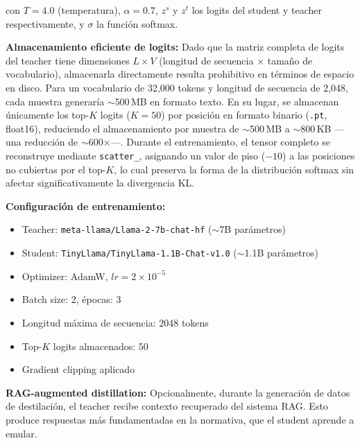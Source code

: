 \documentclass[conference]{IEEEtran}
\begin{document}
con $T=4.0$ (temperatura), $\alpha=0.7$, $z^s$ y $z^t$ los logits del student y teacher respectivamente, y $\sigma$ la funci\'on softmax.

\textbf{Almacenamiento eficiente de logits:} Dado que la matriz completa de logits del teacher tiene dimensiones $L \times V$ (longitud de secuencia $\times$ tama\~no de vocabulario), almacenarla directamente resulta prohibitivo en t\'erminos de espacio en disco. Para un vocabulario de 32,000 tokens y longitud de secuencia de 2,048, cada muestra generar\'ia $\sim$500\,MB en formato texto. En su lugar, se almacenan \'unicamente los top-$K$ logits ($K=50$) por posici\'on en formato binario (\texttt{.pt}, float16), reduciendo el almacenamiento por muestra de $\sim$500\,MB a $\sim$800\,KB ---una reducci\'on de $\sim$600$\times$---. Durante el entrenamiento, el tensor completo se reconstruye mediante \texttt{scatter\_}, asignando un valor de piso ($-10$) a las posiciones no cubiertas por el top-$K$, lo cual preserva la forma de la distribuci\'on softmax sin afectar significativamente la divergencia KL.

\textbf{Configuraci\'on de entrenamiento:}
\begin{itemize}
    \item Teacher: \texttt{meta-llama/Llama-2-7b-chat-hf} ($\sim$7B par\'ametros)
    \item Student: \texttt{TinyLlama/TinyLlama-1.1B-Chat-v1.0} ($\sim$1.1B par\'ametros)
    \item Optimizer: AdamW, $lr = 2 \times 10^{-5}$
    \item Batch size: 2, \'epocas: 3
    \item Longitud m\'axima de secuencia: 2048 tokens
    \item Top-$K$ logits almacenados: 50
    \item Gradient clipping aplicado
\end{itemize}

\textbf{RAG-augmented distillation:} Opcionalmente, durante la generaci\'on de datos de destilaci\'on, el teacher recibe contexto recuperado del sistema RAG. Esto produce respuestas m\'as fundamentadas en la normativa, que el student aprende a emular.
\end{document}
